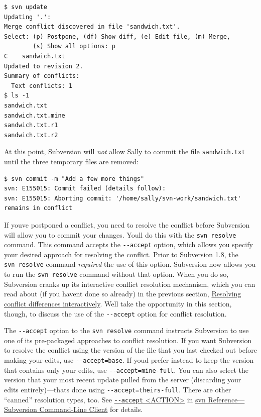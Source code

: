 \begin{verbatim}
$ svn update
Updating '.':
Merge conflict discovered in file 'sandwich.txt'.
Select: (p) Postpone, (df) Show diff, (e) Edit file, (m) Merge,
        (s) Show all options: p
C    sandwich.txt
Updated to revision 2.
Summary of conflicts:
  Text conflicts: 1
$ ls -1
sandwich.txt
sandwich.txt.mine
sandwich.txt.r1
sandwich.txt.r2
\end{verbatim}

At this point, Subversion will \emph{not} allow Sally to commit the file
\texttt{sandwich.txt} until the three temporary files are removed:

\begin{verbatim}
$ svn commit -m "Add a few more things"
svn: E155015: Commit failed (details follow):
svn: E155015: Aborting commit: '/home/sally/svn-work/sandwich.txt' remains in conflict
\end{verbatim}

If you\textquotesingle ve postponed a conflict, you need to resolve the
conflict before Subversion will allow you to commit your changes.
You\textquotesingle ll do this with the \texttt{svn\ resolve} command.
This command accepts the \texttt{-\/-accept} option, which allows you
specify your desired approach for resolving the conflict. Prior to
Subversion 1.8, the \texttt{svn\ resolve} command \emph{required} the
use of this option. Subversion now allows you to run the
\texttt{svn\ resolve} command without that option. When you do so,
Subversion cranks up its interactive conflict resolution mechanism,
which you can read about (if you haven\textquotesingle t done so
already) in the previous section,
\hyperref[svn.tour.cycle.resolve.resolve]{Resolving conflict differences
interactively}. We\textquotesingle ll take the opportunity in this
section, though, to discuss the use of the \texttt{-\/-accept} option
for conflict resolution.

The \texttt{-\/-accept} option to the \texttt{svn\ resolve} command
instructs Subversion to use one of its pre-packaged approaches to
conflict resolution. If you want Subversion to resolve the conflict
using the version of the file that you last checked out before making
your edits, use \texttt{-\/-accept=base}. If you\textquotesingle d
prefer instead to keep the version that contains only your edits, use
\texttt{-\/-accept=mine-full}. You can also select the version that your
most recent update pulled from the server (discarding your edits
entirely)---that\textquotesingle s done using
\texttt{-\/-accept=theirs-full}. There are other ``canned'' resolution
types, too. See \hyperref[svn.ref.svn.sw.accept]{\texttt{-\/-accept}
\textless ACTION\textgreater{}} in \hyperref[svn.ref.svn]{svn
Reference---Subversion Command-Line Client} for details.

